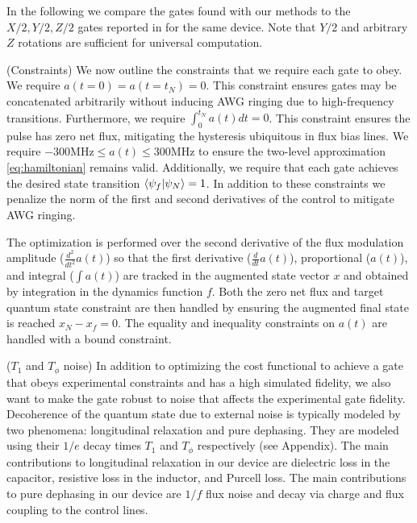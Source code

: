 \documentclass[
  amsfonts,
  amsmath,
  tbtags,
  amssymb,
  aps,
  nobibnotes,
  twocolumn,
]{revtex4-2}
\begin{document}
In the following we compare the gates found with our methods
to the $X/2, Y/2, Z/2$ gates reported in \cite{zhang2020universal}
for the same device. Note that $Y/2$ and arbitrary $Z$ rotations
are sufficient for universal computation.

(Constraints) We now outline the constraints that we require each gate
to obey.
We require $a(t = 0) = a(t = t_{N}) = 0$.
This constraint ensures gates may be concatenated arbitrarily without
inducing AWG ringing due to high-frequency transitions.
Furthermore, we require $\int_{0}^{t_{N}} a(t) dt = 0$. This
constraint ensures the pulse has zero net flux, mitigating
the hysteresis ubiquitous in flux bias lines.
We require $-300 \textrm{MHz} \le a(t) \le 300 \textrm{MHz}$
to ensure the two-level approximation \ref{eq:hamiltonian}
remains valid. Additionally, we require that each gate achieves
the desired state transition $\braket{\psi_{f} \lvert \psi_{N}} = 1$.
In addition to these constraints we penalize the norm
of the first and second derivatives of the control
to mitigate AWG ringing.

The optimization is performed
over the second derivative of the flux modulation amplitude
($\frac{d^{2}}{dt^{2}} a(t)$) so that the first derivative
($\frac{d}{dt} a(t)$), proportional ($a(t)$), and integral ($\int a(t)$)
are tracked in the augmented state vector $x$ and obtained by
integration in the dynamics function $f$.
Both the zero net flux and target quantum state constraint
are then handled by ensuring the augmented final state is
reached $x_{N} - x_{f} = 0$.
The equality and inequality constraints on $a(t)$ are handled
with a bound constraint.

($T_{1}$ and $T_{\phi}$ noise)
In addition to optimizing the cost functional to achieve a gate
that obeys experimental constraints and has a high simulated fidelity,
we also want to make the gate robust to noise that affects the experimental
gate fidelity. Decoherence of the quantum state due to external noise
is typically modeled by two phenomena: longitudinal relaxation and pure dephasing.
They are modeled using their $1/e$ decay times $T_{1}$ and $T_{\phi}$ respectively
(see Appendix).
The main contributions to longitudinal relaxation in our
device are dielectric loss in the capacitor, resistive loss in the inductor,
and Purcell loss. The main contributions to pure dephasing in our
device are $1/f$ flux noise and decay via charge and flux coupling
to the control lines.
\end{document}
